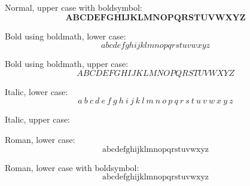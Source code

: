 \documentclass[12pt,a4paper]{article}
\theoremstyle{clearprint}
\begin{document}
\noindent 
Normal, upper case with boldsymbol:
\begin{equation}
\boldsymbol{A  B  C  D  E  F  G  H  I  J  K  L  M  N  O  P  Q  R  S  T  U  V  W  X  Y  Z} 
\end{equation}

\noindent 
Bold using boldmath, lower case:\boldmath
\begin{equation}
a  b  c  d  e  f  g  h  i  j  k  l  m  n  o  p  q  r  s  t  u  v  w  x  y  z
\end{equation}\unboldmath

\noindent 
Bold using boldmath, upper case:\boldmath
\begin{equation}
A  B  C  D  E  F  G  H  I  J  K  L  M  N  O  P  Q  R  S  T  U  V  W  X  Y  Z  
\end{equation}\unboldmath


Italic, lower case:
\begin{equation}
\mathit{a}~\mathit{b}~\mathit{c}~\mathit{d}~\mathit{e}~\mathit{f}~\mathit{g}~\mathit{h}~\mathit{i}~\mathit{j}~\mathit{k}~\mathit{l}~\mathit{m}~\mathit{n}~\mathit{o}~\mathit{p}~\mathit{q}~\mathit{r}~\mathit{s}~\mathit{t}~\mathit{u}~\mathit{v}~\mathit{w}~\mathit{x}~\mathit{y}~\mathit{z}
\end{equation}

Italic, upper case:
\begin{equation}
\end{equation}

\noindent 
Roman, lower case:
\begin{equation}
\mathrm{a}  \mathrm{b}  \mathrm{c}  \mathrm{d}  \mathrm{e}  \mathrm{f}  \mathrm{g}  \mathrm{h}  \mathrm{i}  \mathrm{j}  \mathrm{k}  \mathrm{l}  \mathrm{m}  \mathrm{n}  \mathrm{o}  \mathrm{p}  \mathrm{q}  \mathrm{r}  \mathrm{s}  \mathrm{t}  \mathrm{u}  \mathrm{v}  \mathrm{w}  \mathrm{x}  \mathrm{y}  \mathrm{z}
\end{equation}

\noindent 
Roman, lower case with boldsymbol:
\begin{equation}
\boldsymbol{\mathrm{a}  \mathrm{b}  \mathrm{c}  \mathrm{d}  \mathrm{e}  \mathrm{f}  \mathrm{g}  \mathrm{h}  \mathrm{i}  \mathrm{j}  \mathrm{k}  \mathrm{l}  \mathrm{m}  \mathrm{n}  \mathrm{o}  \mathrm{p}  \mathrm{q}  \mathrm{r}  \mathrm{s}  \mathrm{t}  \mathrm{u}  \mathrm{v}  \mathrm{w}  \mathrm{x}  \mathrm{y}  \mathrm{z}}
\end{equation}
\end{document}
